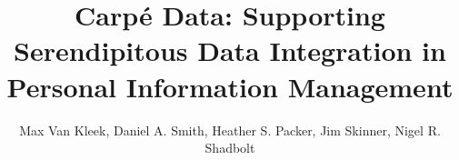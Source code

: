 \documentclass{sigchi}
\begin{document}
\title{Carp\'{e} Data: Supporting Serendipitous Data Integration in Personal Information Management}

 \author{
   \alignauthor Max Van Kleek, Daniel A. Smith, Heather S. Packer, Jim Skinner, Nigel R. Shadbolt \\
     \\
     \\
     }


\maketitle
\end{document}
